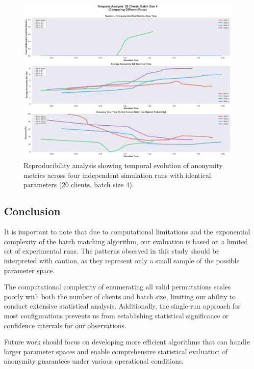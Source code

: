 \documentclass{article}
\begin{document}
\begin{figure}[!htb]
\centering
\includegraphics[width=\textwidth]{diagrams/temporal_20client_4batch_runs.png}
\caption{Reproducibility analysis showing temporal evolution of anonymity metrics across four independent simulation runs with identical parameters (20 clients, batch size 4).}
\label{fig:temporal_analysis_20_4_runs}
\end{figure}

\subsection{Conclusion}
It is important to note that due to computational limitations 
and the exponential complexity of the batch matching algorithm, 
our evaluation is based on a limited set of experimental runs. 
The patterns observed in this study should be interpreted with 
caution, as they represent only a small sample of the possible 
parameter space.

The computational complexity of enumerating all valid permutations 
scales poorly with both the number of clients and batch size, 
limiting our ability to conduct extensive statistical analysis. 
Additionally, the single-run approach for most configurations 
prevents us from establishing statistical significance or 
confidence intervals for our observations.

Future work should focus on developing more efficient algorithms 
that can handle larger parameter spaces and enable comprehensive 
statistical evaluation of anonymity guarantees under various 
operational conditions.
\end{document}
